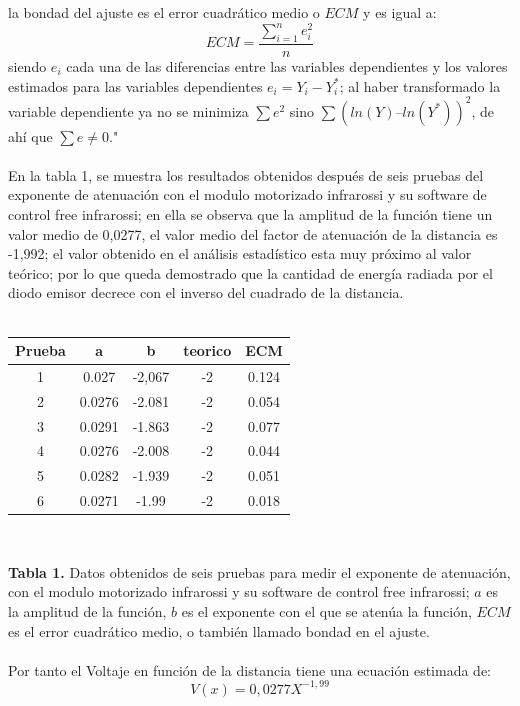 \documentclass[12]{article}
\begin{document}
\begin{multicols}{2}
\begin{equation}
\end{equation}
la bondad del ajuste es el error cuadrático medio o $ECM$ y es igual a: 
\begin{equation}
ECM = \frac{\sum_{i=1}^{n}e_{i}^{2}}{n}
\end{equation}
siendo $e_{i}$ cada una de las diferencias entre las variables dependientes y los valores estimados para las variables dependientes $e_{i} = Y_{i} - Y^{*}_{i}$; al haber transformado la variable dependiente ya no se minimiza $\sum e^{2}$ sino $\sum (ln(Y) – ln(Y^{*}))^{2}$, de ahí que $\sum e \neq 0$."\cite{ESTADISTICA}\\\\
En la tabla 1, se muestra los resultados obtenidos después de seis pruebas del exponente de atenuación con el modulo motorizado infrarossi y su software de control free infrarossi; en ella se observa que la amplitud de la función tiene un valor medio de 0,0277, el valor medio del factor de atenuación de la distancia es -1,992; el valor obtenido en el análisis estadístico esta muy próximo al valor teórico; por lo que queda demostrado que la cantidad de energía radiada por el diodo emisor decrece con el inverso del cuadrado de la distancia. \\ \\
\begin{center}
\begin{tabular}{|c|c|c|c|c|} 
\hline
\bf{Prueba} & \bf{a} & \bf{b} & \bf{teorico} & \bf{ECM} \\
\hline
 1 & 0.027 & -2,067 & -2 & 0.124\\
\hline
 2 & 0.0276 & -2.081 & -2 & 0.054\\
\hline
 3 & 0.0291 & -1.863 & -2 & 0.077\\
\hline 
 4 & 0.0276 & -2.008 & -2 & 0.044\\
\hline
5 & 0.0282 & -1.939 & -2 & 0.051\\
\hline
6 & 0.0271 & -1.99 & -2 & 0.018\\
\hline
\end{tabular}
\\
\end{center}
\textbf{Tabla 1.} Datos obtenidos de seis pruebas para medir el exponente de atenuación, con el modulo motorizado infrarossi y su software de control free infrarossi; $a$ es la amplitud de la función, $b$ es el exponente con el que se atenúa la función, $ECM$ es el error cuadrático medio, o también llamado bondad en el ajuste. \\ \\ 
Por tanto el Voltaje en función de la distancia tiene una ecuación estimada de:
\begin{equation}
V(x) = 0,0277 X^{-1,99} 
\end{equation}

\end{multicols}
\end{document}
